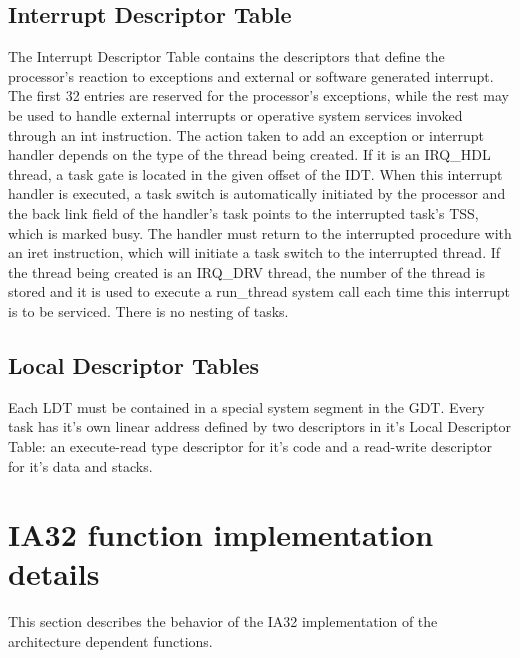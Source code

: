 \documentclass[11pt, letterpaper, twoside, english]{book}
\begin{document}
\subsection{Interrupt Descriptor Table}

The Interrupt Descriptor Table contains the descriptors that define the processor's reaction to exceptions and external or software generated interrupt. The first 32 entries are reserved for the processor's exceptions, while the rest may be used to handle external interrupts or operative system services invoked through an \textsf{int} instruction. The action taken to add an exception or interrupt handler depends on the type of the thread being created. If it is an \textsf{IRQ\_HDL} thread, a task gate is located in the given offset of the IDT. When this interrupt handler is executed, a task switch is automatically initiated by the processor and the back link field of the handler's task points to the interrupted task's TSS, which is marked busy. The handler must return to the interrupted procedure with an \textsf{iret} instruction, which will initiate a task switch to the interrupted thread. If the thread being created is an \textsf{IRQ\_DRV} thread, the number of the thread is stored and it is used to execute a \textsf{run\_thread} system call each time this interrupt is to be serviced. There is no nesting of tasks.

\subsection{Local Descriptor Tables}

Each LDT must be contained in a special system segment in the GDT. Every task has it's own linear address defined by two descriptors in it's Local Descriptor Table: an execute-read type descriptor for it's code and a read-write descriptor for it's data and stacks.

\section{IA32 function implementation details}

This section describes the behavior of the IA32 implementation of the architecture dependent functions.
\end{document}
